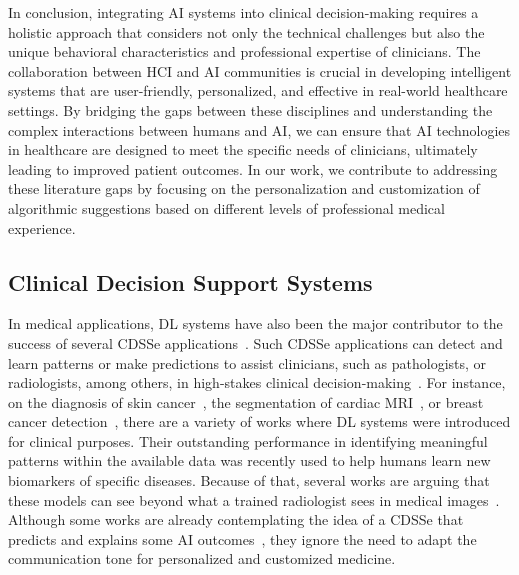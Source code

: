 In conclusion, integrating \ac{AI} systems into clinical decision-making requires a holistic approach that considers not only the technical challenges but also the unique behavioral characteristics and professional expertise of clinicians.
The collaboration between \ac{HCI} and \ac{AI} communities is crucial in developing intelligent systems that are user-friendly, personalized, and effective in real-world healthcare settings.
By bridging the gaps between these disciplines and understanding the complex interactions between humans and \ac{AI}, we can ensure that \ac{AI} technologies in healthcare are designed to meet the specific needs of clinicians, ultimately leading to improved patient outcomes.
In our work, we contribute to addressing these literature gaps by focusing on the personalization and customization of algorithmic suggestions based on different levels of professional medical experience.

\subsection{Clinical Decision Support Systems}
\label{sec:app005003003}

In medical applications, \ac{DL} systems have also been the major contributor to the success of several \ac{CDSSe} applications~\cite{esteva2019guide}.
Such \ac{CDSSe} applications can detect and learn patterns or make predictions to assist clinicians, such as pathologists, or radiologists, among others, in high-stakes clinical decision-making~\cite{10.1145/3555157}.
For instance, on the diagnosis of skin cancer~\cite{esteva2017dermatologist}, the segmentation of cardiac \ac{MRI}~\cite{8759179}, or breast cancer detection~\cite{MAICAS2019101562}, there are a variety of works where \ac{DL} systems were introduced for clinical purposes.
Their outstanding performance in identifying meaningful patterns within the available data was recently used to help humans learn new biomarkers of specific diseases.
Because of that, several works are arguing that these models can see beyond what a trained radiologist sees in medical images~\cite{mckinney2020international, Rajpurkar2022}.
Although some works are already contemplating the idea of a \ac{CDSSe} that predicts and explains some \ac{AI} outcomes~\cite{MAICAS2019101562, CALISTO2022102285}, they ignore the need to adapt the communication tone for personalized and customized medicine.

